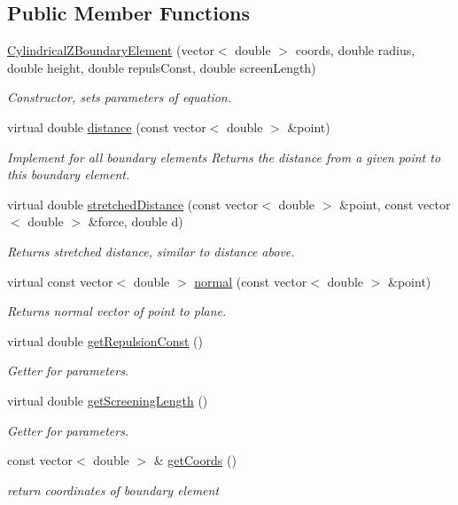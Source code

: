 \subsection*{Public Member Functions}
\begin{DoxyCompactItemize}
\item 
\hyperlink{classCylindricalZBoundaryElement_a32125b8a959d46949177a984e555e689}{Cylindrical\+Z\+Boundary\+Element} (vector$<$ double $>$ coords, double radius, double height, double repuls\+Const, double screen\+Length)
\begin{DoxyCompactList}\small\item\em Constructor, sets parameters of equation. \end{DoxyCompactList}\item 
virtual double \hyperlink{classCylindricalZBoundaryElement_a2532a472c9cd58a65940f43e05050d97}{distance} (const vector$<$ double $>$ \&point)
\begin{DoxyCompactList}\small\item\em Implement for all boundary elements Returns the distance from a given point to this boundary element. \end{DoxyCompactList}\item 
virtual double \hyperlink{classCylindricalZBoundaryElement_a6c3fc8e0f7bf828c21b70c396ed88dc0}{stretched\+Distance} (const vector$<$ double $>$ \&point, const vector$<$ double $>$ \&force, double d)
\begin{DoxyCompactList}\small\item\em Returns stretched distance, similar to distance above. \end{DoxyCompactList}\item 
virtual const vector$<$ double $>$ \hyperlink{classCylindricalZBoundaryElement_a5832dede61b710421f5307d5b7bfb982}{normal} (const vector$<$ double $>$ \&point)
\begin{DoxyCompactList}\small\item\em Returns normal vector of point to plane. \end{DoxyCompactList}\item 
virtual double \hyperlink{classCylindricalZBoundaryElement_a6f090f1ff1ebf10695ab3cf2db3fb8bf}{get\+Repulsion\+Const} ()
\begin{DoxyCompactList}\small\item\em Getter for parameters. \end{DoxyCompactList}\item 
virtual double \hyperlink{classCylindricalZBoundaryElement_afe407ba95087aff6598141daccb06d39}{get\+Screening\+Length} ()
\begin{DoxyCompactList}\small\item\em Getter for parameters. \end{DoxyCompactList}\item 
const vector$<$ double $>$ \& \hyperlink{classBoundaryElement_ace76817d750bb44c11edd918f1a8b78f}{get\+Coords} ()
\begin{DoxyCompactList}\small\item\em return coordinates of boundary element \end{DoxyCompactList}\end{DoxyCompactItemize}
